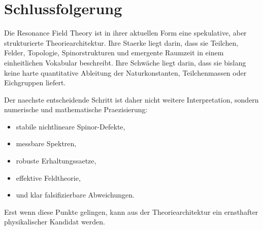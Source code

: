 \documentclass[11pt,a4paper]{article}
\newcommand{\RFT}{Resonance Field Theory}
\begin{document}
\section{Schlussfolgerung}

Die \RFT{} ist in ihrer aktuellen Form eine spekulative, aber strukturierte Theoriearchitektur. Ihre Staerke liegt
darin, dass sie Teilchen, Felder, Topologie, Spinorstrukturen und emergente Raumzeit in einem einheitlichen
Vokabular beschreibt. Ihre Schwäche liegt darin, dass sie bislang keine harte quantitative Ableitung der
Naturkonstanten, Teilchenmassen oder Eichgruppen liefert.

Der naechste entscheidende Schritt ist daher nicht weitere Interpretation, sondern numerische und mathematische
Praezisierung:
\begin{itemize}
  \item stabile nichtlineare Spinor-Defekte,
  \item messbare Spektren,
  \item robuste Erhaltungssaetze,
  \item effektive Feldtheorie,
  \item und klar falsifizierbare Abweichungen.
\end{itemize}

Erst wenn diese Punkte gelingen, kann aus der Theoriearchitektur ein ernsthafter physikalischer Kandidat werden.
\end{document}

